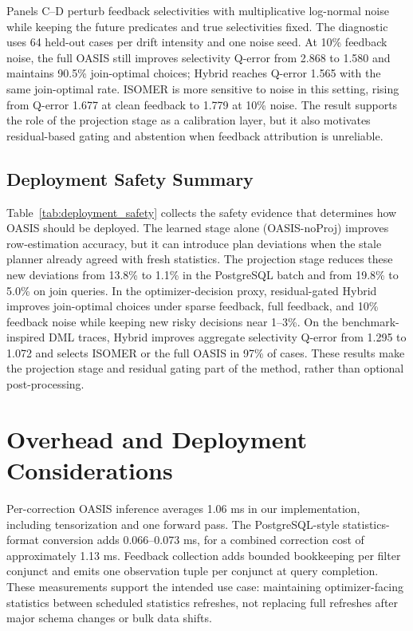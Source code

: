\documentclass[preprint,12pt]{elsarticle}
\newcommand{\oasisUseMaxWidthResize}[1]{%
  \renewcommand{\resizebox}[3]{\adjustbox{max width=#1}{##3}}%
}
\begin{document}
Panels C--D perturb feedback selectivities with
multiplicative log-normal noise while keeping the future predicates and true
selectivities fixed. The diagnostic uses 64 held-out cases per drift intensity
and one noise seed. At 10\% feedback noise, the full OASIS still improves
selectivity Q-error from 2.868 to 1.580 and maintains 90.5\% join-optimal
choices; Hybrid reaches Q-error 1.565 with the same join-optimal rate. ISOMER
is more sensitive to noise in this setting, rising from Q-error 1.677 at clean
feedback to 1.779 at 10\% noise. The result supports the role of the projection
stage as a calibration layer, but it also motivates residual-based gating and
abstention when feedback attribution is unreliable.

\subsection{Deployment Safety Summary}
\label{sec:deployment-safety}

\begingroup
\oasisUseMaxWidthResize{.97\textwidth}

\endgroup

Table~\ref{tab:deployment_safety} collects the safety evidence that determines
how OASIS should be deployed. The learned stage alone (OASIS-noProj) improves
row-estimation accuracy, but it can introduce plan deviations when the stale
planner already agreed with fresh statistics. The projection stage reduces these
new deviations from 13.8\% to 1.1\% in the PostgreSQL batch and from 19.8\% to
5.0\% on join queries. In the optimizer-decision proxy, residual-gated Hybrid
improves join-optimal choices under sparse feedback, full feedback, and 10\%
feedback noise while keeping new risky decisions near 1--3\%. On the
benchmark-inspired DML traces, Hybrid improves aggregate selectivity Q-error
from 1.295 to 1.072 and selects ISOMER or the full OASIS in 97\% of cases. These
results make the projection stage and residual gating part of the method,
rather than optional post-processing.

\section{Overhead and Deployment Considerations}
\label{sec:overhead}

Per-correction OASIS inference averages 1.06 ms in our implementation,
including tensorization and one forward pass. The PostgreSQL-style
statistics-format conversion adds 0.066--0.073 ms, for a combined correction
cost of approximately 1.13 ms. Feedback collection adds bounded bookkeeping
per filter conjunct and emits one observation tuple per conjunct at query
completion. These measurements support the intended use case: maintaining
optimizer-facing statistics between scheduled statistics refreshes, not
replacing full refreshes after major schema changes or bulk data shifts.
\end{document}
